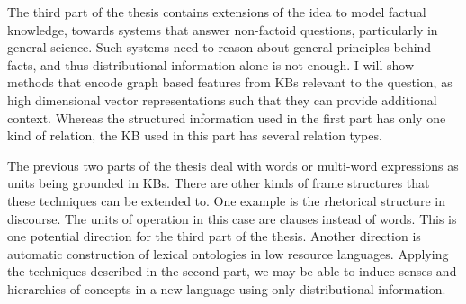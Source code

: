 The third part of the thesis contains extensions of the idea to model factual knowledge, towards
systems that answer non-factoid questions, particularly in general science. Such systems 
need to reason about general principles behind facts, and thus distributional information
alone is not enough. I will show methods that encode graph based features from KBs relevant to the 
question, as high dimensional vector representations such that they can provide 
additional context. Whereas the structured information used in the first part has only one kind of
relation, the KB used in this part has several relation types. 

The previous two parts of the thesis deal with words or multi-word expressions as units being grounded in KBs. 
There are other kinds of frame structures that these techniques can be extended to. One example is the rhetorical 
structure in discourse. The units of operation in this case are clauses instead of words. This is one potential 
direction for the third part of the thesis. Another direction is automatic construction of lexical ontologies in 
low resource languages. Applying the techniques described in the second part, we may be able to induce senses and 
hierarchies of concepts in a new language using only distributional information.
